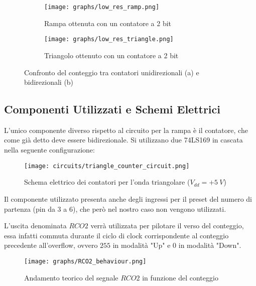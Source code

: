 \begin{figure}[H]
    \centering

    \begin{subfigure}{.5\textwidth}
        \centering
        \texttt{[image: graphs/low\_res\_ramp.png]}
        \caption{Rampa ottenuta con un contatore a 2 bit}
    \end{subfigure}%
    \begin{subfigure}{.5\textwidth}
        \centering
        \texttt{[image: graphs/low\_res\_triangle.png]}
        \caption{Triangolo ottenuto con un contatore a 2 bit}
    \end{subfigure}

    \caption{Confronto del conteggio tra contatori unidirezionali (a) e bidirezionali (b)}
    \label{steps}
\end{figure}


\subsection*{Componenti Utilizzati e Schemi Elettrici}


L'unico componente diverso rispetto al circuito per la rampa è il contatore, che come già
detto deve essere bidirezionale. Si utilizzano due 74LS169 \cite{74ls169} in cascata nella
seguente configurazione:

\begin{figure}[H]
    \centering
    \texttt{[image: circuits/triangle\_counter\_circuit.png]}
    \caption{Schema elettrico dei contatori per l'onda triangolare ($V_{dd}=+5\ V$)}
    \label{triangle_counter_circuit}
\end{figure}

Il componente utilizzato presenta anche degli ingressi per il preset del numero di partenza
(pin da 3 a 6), che però nel nostro caso non vengono utilizzati.

L'uscita denominata $RCO2$ verrà utilizzata per pilotare il verso del conteggio, essa infatti
commuta durante il ciclo di clock corrispondente al conteggio precedente all'overflow, ovvero
$255$ in modalità "Up" e $0$ in modalità "Down".

\begin{figure}[H]
    \centering
    \texttt{[image: graphs/RCO2\_behaviour.png]}
    \caption{Andamento teorico del segnale $RCO2$ in funzione del conteggio}
    \label{RCO2_behaviour}
\end{figure}

